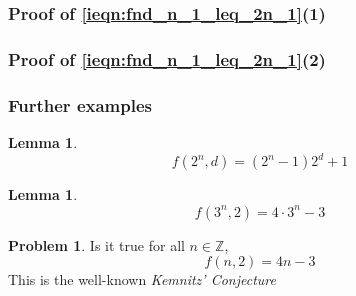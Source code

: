 \documentclass[notheorems, envcountsect]{beamer}
\theoremstyle{definition}
\newtheorem{lemma}[theorem]{Lemma}
\newtheorem{remark}[theorem]{Remark}
\theoremstyle{definition}
\newtheorem{problem}[theorem]{Problem}
\numberwithin{equation}{theorem}
\numberwithin{figure}{theorem}
\newcommand{\kemnitzConjecture}{\emph{Kemnitz' Conjecture}}
\newcommand{\Integer}{\ensuremath{\mathbb{Z}}}
\newcommand{\fnd}[2]{\ensuremath{f(#1,#2)}}
\begin{document}

\begin{frame}
    \frametitle{Proof of \eqref{ieqn:fnd_n_1_leq_2n_1}(1)}
\end{frame}


\begin{frame}
    \frametitle{Proof of \eqref{ieqn:fnd_n_1_leq_2n_1}(2)}
\end{frame}

\begin{frame}
    \frametitle{Further examples}
    \begin{lemma}\label{lem:f_nd_2_potent}
        \begin{equation*}
            \fnd{2^n}{d} = (2^n - 1) 2^d + 1
        \end{equation*}
    \end{lemma}
    \pause
    \begin{lemma}\label{lem:f_3Potent_2_value}
        \begin{equation*}
            \fnd{3^n}{2} = 4 \cdot 3^n - 3
        \end{equation*}
    \end{lemma}
    \pause
    \begin{problem}
        Is it true for all $n \in \Integer$,
        \[\fnd{n}{2} = 4n - 3\]
        This is the well-known \kemnitzConjecture{}
    \end{problem}
\end{frame}
\end{document}
